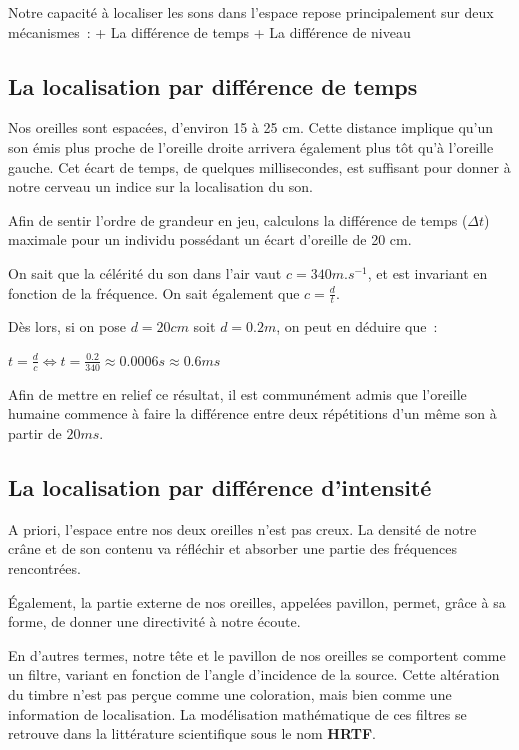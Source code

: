 \documentclass[
]{book}
\begin{document}
Notre capacité à localiser les sons dans l'espace repose principalement sur deux mécanismes~:
+ La différence de temps
+ La différence de niveau

\hypertarget{la-localisation-par-diffuxe9rence-de-temps}{%
\subsection{La localisation par différence de temps}\label{la-localisation-par-diffuxe9rence-de-temps}}

Nos oreilles sont espacées, d'environ 15 à 25 cm. Cette distance implique qu'un son émis plus proche de l'oreille droite arrivera également plus tôt qu'à l'oreille gauche. Cet écart de temps, de quelques millisecondes, est suffisant pour donner à notre cerveau un indice sur la localisation du son.

Afin de sentir l'ordre de grandeur en jeu, calculons la différence de temps (\(\Delta t\)) maximale pour un individu possédant un écart d'oreille de 20 cm.

On sait que la célérité du son dans l'air vaut \(c = 340 m.s^{-1}\), et est invariant en fonction de la fréquence. On sait également que \(c = \frac{d}{t}\).

Dès lors, si on pose \(d = 20 cm\) soit \(d = 0.2 m\), on peut en déduire que~:

\(t = \frac{d}{c} \iff t= \frac{0.2}{340} \approx 0.0006 s \approx 0.6 ms\)

Afin de mettre en relief ce résultat, il est communément admis que l'oreille humaine commence à faire la différence entre deux répétitions d'un même son à partir de \(20 ms\).

\hypertarget{la-localisation-par-diffuxe9rence-dintensituxe9}{%
\subsection{La localisation par différence d'intensité}\label{la-localisation-par-diffuxe9rence-dintensituxe9}}

A priori, l'espace entre nos deux oreilles n'est pas creux. La densité de notre crâne et de son contenu va réfléchir et absorber une partie des fréquences rencontrées.

Également, la partie externe de nos oreilles, appelées pavillon, permet, grâce à sa forme, de donner une directivité à notre écoute.

En d'autres termes, notre tête et le pavillon de nos oreilles se comportent comme un filtre, variant en fonction de l'angle d'incidence de la source. Cette altération du timbre n'est pas perçue comme une coloration, mais bien comme une information de localisation. La modélisation mathématique de ces filtres se retrouve dans la littérature scientifique sous le nom \textbf{HRTF}.
\end{document}
